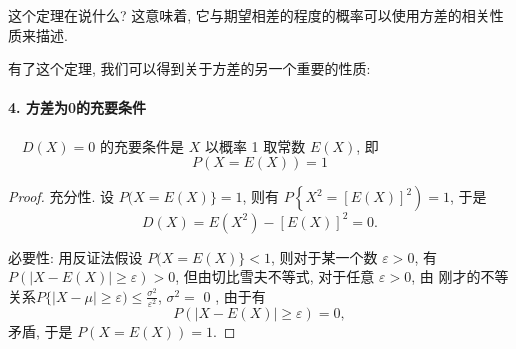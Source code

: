 这个定理在说什么? 这意味着, 它与期望相差的程度的概率可以使用方差的相关性质来描述. 

有了这个定理, 我们可以得到关于方差的另一个重要的性质: 

\paragraph{4. 方差为0的充要条件} $\quad D(X)=0$ 的充要条件是 $X$ 以概率 1 取常数 $E(X)$, 即
$$
P(X=E(X))=1
$$

\begin{proof}
    充分性. 设 $P(X=E(X)\}=1$, 则有 $P\left\{X^2=[E(X)]^2\right)=1$, 于是
    $$
    D(X)=E\left(X^2\right)-[E(X)]^2=0 .
    $$
    
    必要性: 用反证法假设 $P(X=E(X)\}<1$, 则对于某一个数 $\varepsilon>0$, 有 $P(|X-E(X)| \geq \varepsilon)>0$, 但由切比雪夫不等式, 对于任意 $\varepsilon>0$, 由 刚才的不等关系$P\{|X-\mu| \geq \varepsilon) \leq \frac{\sigma^2}{\varepsilon^2}$, $\sigma^2=$ 0 , 由于有
    $$
    P(|X-E(X)| \geq \varepsilon)=0,
    $$
    矛盾, 于是 $P(X=E(X))=1$.
\end{proof}